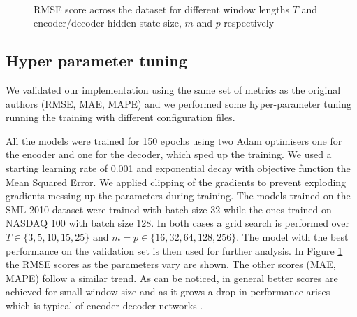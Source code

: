 \documentclass{article}
\begin{document}
\newpage

\begin{figure}[h]
  \centering
   \\
  \caption{RMSE score across the dataset for different
   window lengths $T$ and encoder/decoder hidden state size,
   $m$ and $p$ respectively}
  \label{fig:hype}
\end{figure}

\subsection{Hyper parameter tuning}

We validated our implementation using the same set of metrics as the original 
authors (RMSE, MAE, MAPE) and we performed some hyper-parameter tuning running the training with
different configuration files.

All the models were trained for 150 epochs using
two Adam optimisers one for the encoder and one for the decoder, which sped up
the training. We used a starting learning rate of 0.001 and exponential decay with
objective function the Mean Squared Error. We applied clipping of the gradients 
to prevent exploding gradients messing up the parameters during training.
The models trained on the SML 2010 dataset were trained with batch size 32 while
the ones trained on NASDAQ 100 with batch size 128. In both cases a grid search
is performed over $T \in \{3, 5, 10, 15, 25\}$ and $m = p \in \{16, 32, 64, 128, 256\}$.
The model with the best performance on the validation set is then used for further analysis.
In Figure \ref{fig:hype} the RMSE scores as the parameters vary are shown. The
other scores (MAE, MAPE) follow a similar trend. As can be noticed, in general better
scores are achieved for small window size and as it grows a drop in performance arises
which is typical of encoder decoder networks \cite{cho-et-al}.
\end{document}
